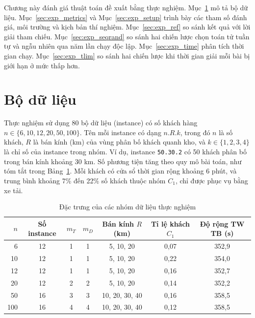 \documentclass[../DoAn.tex]{subfiles}
\begin{document}
Chương này đánh giá thuật toán đề xuất bằng thực nghiệm. Mục~\ref{sec:exp_data} mô tả bộ dữ liệu. Mục~\ref{sec:exp_metrics} và Mục~\ref{sec:exp_setup} trình bày các tham số đánh giá, môi trường và kịch bản thí nghiệm. Mục~\ref{sec:exp_ref} so sánh kết quả với lời giải tham chiếu. Mục~\ref{sec:exp_seqrand} so sánh hai chiến lược chọn toán tử tuần tự và ngẫu nhiên qua năm lần chạy độc lập. Mục~\ref{sec:exp_time} phân tích thời gian chạy. Mục~\ref{sec:exp_tlim} so sánh hai chiến lược khi thời gian giải mỗi bài bị giới hạn ở mức thấp hơn.

\section{Bộ dữ liệu}
\label{sec:exp_data}

Thực nghiệm sử dụng 80 bộ dữ liệu (instance) có số khách hàng $n \in \{6, 10, 12, 20, 50, 100\}$. Tên mỗi instance có dạng $n.R.k$, trong đó $n$ là số khách, $R$ là bán kính (km) của vùng phân bố khách quanh kho, và $k \in \{1, 2, 3, 4\}$ là chỉ số của instance trong nhóm. Ví dụ, instance \texttt{50.30.2} có 50 khách phân bố trong bán kính khoảng 30 km. Số phương tiện tăng theo quy mô bài toán, như tóm tắt trong Bảng~\ref{tab:data}. Mỗi khách có cửa sổ thời gian rộng khoảng 6 phút, và trung bình khoảng 7\% đến 22\% số khách thuộc nhóm $C_1$, chỉ được phục vụ bằng xe tải.

\begin{table}[H]
\centering
\caption{Đặc trưng của các nhóm dữ liệu thực nghiệm}
\label{tab:data}
\begin{tabular}{rcccccc}
\toprule
$n$ & \textbf{Số instance} & $m_T$ & $m_D$ & \textbf{Bán kính $R$ (km)} & \textbf{Tỉ lệ khách $C_1$} & \textbf{Độ rộng TW TB (s)} \\
\midrule
6   & 12 & 1 & 1 & 5, 10, 20 & 0,07 & 352,9 \\
10  & 12 & 1 & 1 & 5, 10, 20 & 0,22 & 354,0 \\
12  & 12 & 1 & 1 & 5, 10, 20 & 0,16 & 352,7 \\
20  & 12 & 2 & 2 & 5, 10, 20 & 0,14 & 352,2 \\
50  & 16 & 3 & 3 & 10, 20, 30, 40 & 0,16 & 358,5 \\
100 & 16 & 4 & 4 & 10, 20, 30, 40 & 0,12 & 358,5 \\
\bottomrule
\end{tabular}
\end{table}
\end{document}
